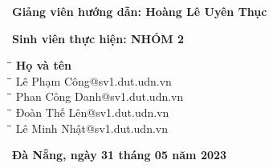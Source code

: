 \documentclass[a4paper]{article}
\begin{document}
\begin{titlepage}
\vspace{50pt}
\begin{addmargin}[1cm]{0cm}
\textbf{Giảng viên hướng dẫn: \hspace{2cm}Hoàng Lê Uyên Thục}
\end{addmargin}
\vspace{10pt}
\begin{addmargin}[1cm]{0cm}
\textbf{Sinh viên thực hiện: \hspace{2.6cm}NHÓM 2}
\begin{tabbing}
\hspace{4cm}\=\hspace{3cm}\=\hspace{5cm} \kill
{\textbf{Họ và tên}}\\
\hspace{4cm}\=\hspace{3cm}\=\hspace{5cm} \kill
Lê Phạm Công@sv1.dut.udn.vn\\
\hspace{4cm}\=\hspace{3cm}\=\hspace{5cm} \kill
Phan Công Danh@sv1.dut.udn.vn\\
\hspace{4cm}\=\hspace{3cm}\=\hspace{5cm} \kill
Đoàn Thế Lên@sv1.dut.udn.vn\\
\hspace{4cm}\=\hspace{3cm}\=\hspace{5cm} \kill
Lê Minh Nhật@sv1.dut.udn.vn\\
\end{tabbing}
\end{addmargin}
\vspace{2.5cm}
\begin{center}
    \textbf{Đà Nẵng, ngày 31 tháng 05 năm 2023}
\end{center}
\end{titlepage}
\newpage
\tableofcontents
\newpage

\end{document}
